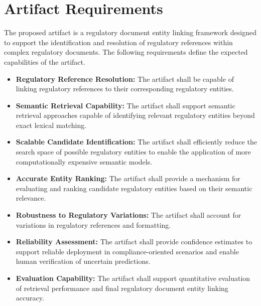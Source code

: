 \section{Artifact Requirements}

The proposed artifact is a regulatory document entity linking framework designed to support the identification and resolution of regulatory references within complex regulatory documents. The following requirements define the expected capabilities of the artifact.

\begin{itemize}

\item \textbf{Regulatory Reference Resolution:}
The artifact shall be capable of linking regulatory references to their corresponding regulatory entities.

\item \textbf{Semantic Retrieval Capability:}
The artifact shall support semantic retrieval approaches capable of identifying relevant regulatory entities beyond exact lexical matching.

\item \textbf{Scalable Candidate Identification:}
The artifact shall efficiently reduce the search space of possible regulatory entities to enable the application of more computationally expensive semantic models.

\item \textbf{Accurate Entity Ranking:}
The artifact shall provide a mechanism for evaluating and ranking candidate regulatory entities based on their semantic relevance.

\item \textbf{Robustness to Regulatory Variations:}
The artifact shall account for variations in regulatory references and formatting.

\item \textbf{Reliability Assessment:}
The artifact shall provide confidence estimates to support reliable deployment in compliance-oriented scenarios and enable human verification of uncertain predictions.

\item \textbf{Evaluation Capability:}
The artifact shall support quantitative evaluation of retrieval performance and final regulatory document entity linking accuracy.

\end{itemize}